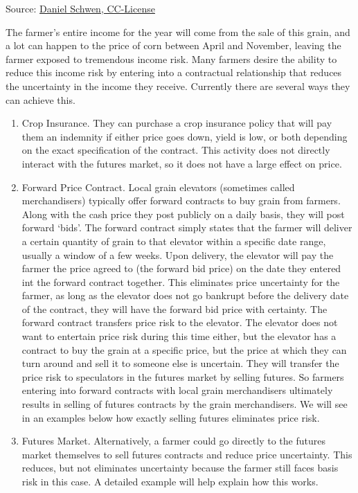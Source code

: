 \documentclass[
  letterpaper,
  DIV=11,
  numbers=noendperiod]{scrreprt}
\begin{document}
Source:
\href{https://commons.wikimedia.org/wiki/File\%3AGrain_elevators_in_Royal\%2C_IL.jpg}{Daniel
Schwen, CC-License}

The farmer's entire income for the year will come from the sale of this
grain, and a lot can happen to the price of corn between April and
November, leaving the farmer exposed to tremendous income risk. Many
farmers desire the ability to reduce this income risk by entering into a
contractual relationship that reduces the uncertainty in the income they
receive. Currently there are several ways they can achieve this.

\begin{enumerate}
\def\labelenumi{\arabic{enumi}.}
\item
  Crop Insurance. They can purchase a crop insurance policy that will
  pay them an indemnity if either price goes down, yield is low, or both
  depending on the exact specification of the contract. This activity
  does not directly interact with the futures market, so it does not
  have a large effect on price.
\item
  Forward Price Contract. Local grain elevators (sometimes called
  merchandisers) typically offer forward contracts to buy grain from
  farmers. Along with the cash price they post publicly on a daily
  basis, they will post forward `bids'. The forward contract simply
  states that the farmer will deliver a certain quantity of grain to
  that elevator within a specific date range, usually a window of a few
  weeks. Upon delivery, the elevator will pay the farmer the price
  agreed to (the forward bid price) on the date they entered int the
  forward contract together. This eliminates price uncertainty for the
  farmer, as long as the elevator does not go bankrupt before the
  delivery date of the contract, they will have the forward bid price
  with certainty. The forward contract transfers price risk to the
  elevator. The elevator does not want to entertain price risk during
  this time either, but the elevator has a contract to buy the grain at
  a specific price, but the price at which they can turn around and sell
  it to someone else is uncertain. They will transfer the price risk to
  speculators in the futures market by selling futures. So farmers
  entering into forward contracts with local grain merchandisers
  ultimately results in selling of futures contracts by the grain
  merchandisers. We will see in an examples below how exactly selling
  futures eliminates price risk.
\item
  Futures Market. Alternatively, a farmer could go directly to the
  futures market themselves to sell futures contracts and reduce price
  uncertainty. This reduces, but not eliminates uncertainty because the
  farmer still faces basis risk in this case. A detailed example will
  help explain how this works.
\end{enumerate}
\end{document}

